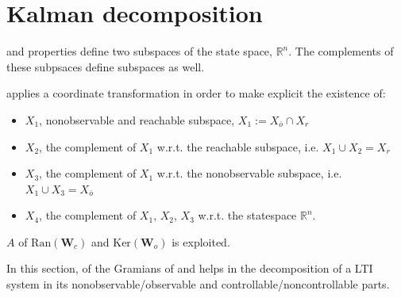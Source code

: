 \documentclass[letterpaper,10pt,english]{jupyterBook}
\begin{document}
\chapter{Kalman decomposition}
\label{\detokenize{ch/system-theory/kalman-decomposition:kalman-decomposition}}\label{\detokenize{ch/system-theory/kalman-decomposition:system-theory-kalman-decomposition}}\label{\detokenize{ch/system-theory/kalman-decomposition::doc}}
\sphinxAtStartPar
{\hyperref[\detokenize{ch/system-theory/controllability-reachability:controllability-reachability}]{}} and {\hyperref[\detokenize{ch/system-theory/observability-detectability:observability-detectability}]{}} properties define two sub\sphinxhyphen{}spaces of the state space, \(\mathbb{R}^n\). The complements of these subpsaces define subspaces as well.

\sphinxAtStartPar
{} applies a coordinate transformation in order to make explicit the existence of:
\begin{itemize}
\item {} 
\sphinxAtStartPar
\(X_1\), non\sphinxhyphen{}observable and reachable sub\sphinxhyphen{}space, \(X_1 := X_{\overline{o}} \cap X_r\)

\item {} 
\sphinxAtStartPar
\(X_2\), the complement of \(X_1\) w.r.t. the reachable sub\sphinxhyphen{}space, i.e. \(X_1 \cup X_2 = X_r\)

\item {} 
\sphinxAtStartPar
\(X_3\), the complement of \(X_1\) w.r.t. the non\sphinxhyphen{}observable sub\sphinxhyphen{}space, i.e. \(X_1 \cup X_3 = X_{\overline{o}}\)

\item {} 
\sphinxAtStartPar
\(X_4\), the complement of \(X_1\), \(X_2\), \(X_3\) w.r.t. the state\sphinxhyphen{}space \(\mathbb{R}^n\).

\end{itemize}

\sphinxAtStartPar
\(A\) of \(\text{Ran}(\mathbf{W}_c)\) and \(\text{Ker}(\mathbf{W}_o)\) is exploited.

\sphinxAtStartPar
In this section, {\hyperref[\detokenize{ch/linear-algebra/svd:math-svd}]{}} of the Gramians of {\hyperref[\detokenize{ch/system-theory/observability-detectability:observability-detectability}]{}} and {\hyperref[\detokenize{ch/system-theory/controllability-reachability:controllability-reachability}]{}} helps in the decomposition of a LTI system in its non\sphinxhyphen{}observable/observable and controllable/non\sphinxhyphen{}controllable parts.
\end{document}
